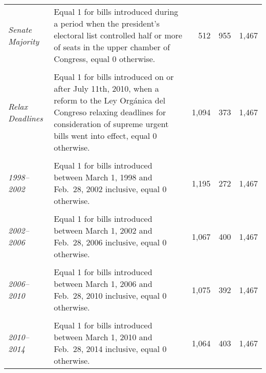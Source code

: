 \documentclass[letter,12pt]{article}
\begin{document}
\begin{footnotesize}
\begin{tabularx}{\textwidth}{lXrrr}
\\ [-1ex]
\emph{Senate Majority}               & Equal 1 for bills introduced during a period when the president's electoral list controlled half or more of seats in the upper chamber of Congress, equal 0 otherwise. &    512 &   955 & 1,467 \\ [.5ex] %
\\ [-1ex]
\emph{Relax Deadlines}               & Equal 1 for bills introduced on or after July 11th, 2010, when a reform to the Ley Org\'anica del Congreso relaxing deadlines for consideration of supreme urgent bills went into effect, equal 0 otherwise. &  1,094 &   373 & 1,467 \\ [.5ex] %
\\ [-1ex]
\emph{1998--2002}                    & Equal 1 for bills introduced between March 1, 1998 and Feb.\ 28, 2002 inclusive, equal 0 otherwise. &  1,195 &   272 & 1,467 \\ [.5ex] %
\\ [-1ex]
\emph{2002--2006}                    & Equal 1 for bills introduced between March 1, 2002 and Feb.\ 28, 2006 inclusive, equal 0 otherwise.       &  1,067 &   400 & 1,467 \\ [.5ex] %
\\ [-1ex]
\emph{2006--2010}                    & Equal 1 for bills introduced between March 1, 2006 and Feb.\ 28, 2010 inclusive, equal 0 otherwise.       &  1,075 &   392 & 1,467 \\ [.5ex] %
\\ [-1ex]
\emph{2010--2014}                    & Equal 1 for bills introduced between March 1, 2010 and Feb.\ 28, 2014 inclusive, equal 0 otherwise.       &  1,064 &   403 & 1,467 \\ [.5ex] %
\hline
\end{tabularx}
\doublespacing
\end{footnotesize}
  
\end{document}
